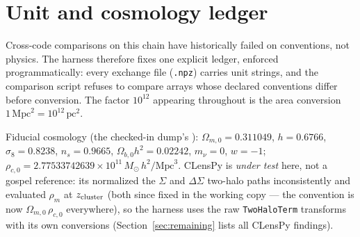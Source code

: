 \section{Unit and cosmology ledger}
\label{sec:ledger}

Cross-code comparisons on this chain have historically failed on
conventions, not physics. The harness therefore fixes one explicit
ledger, enforced programmatically: every exchange file
(\texttt{.npz}) carries unit strings, and the comparison script refuses
to compare arrays whose declared conventions differ before conversion.
The factor $10^{12}$ appearing throughout is the area conversion
$1\,\mathrm{Mpc}^2 = 10^{12}\,\mathrm{pc}^2$.

\begin{table}[H]
\centering
{}
\caption{Unit ledger. The clmm comoving bridge is
$\DStwo^{\rm com}(R^{\rm com}) =
\DStwo^{\rm phys}(R^{\rm com}/(1{+}z))/(1{+}z)^2$ (the single-power
variant used in CLensPy's own test disagrees with the three-way
comparison and is rejected).}
\end{table}

Fiducial cosmology (the checked-in dump's
): $\Omega_{m,0} = 0.311049$, $h = 0.6766$,
$\sigma_8 = 0.8238$, $n_s = 0.9665$, $\Omega_{b,0} h^2 = 0.02242$,
$m_\nu = 0$, $w = -1$;
$\rho_{c,0} = 2.77533742639\times10^{11}\,M_\odot\,h^2/\mathrm{Mpc}^3$.
CLensPy is \emph{under test} here, not a gospel reference: its
 normalized the $\Sigma$ and
$\Delta\Sigma$ two-halo paths inconsistently and evaluated $\rho_m$ at
$z_{\rm cluster}$ (both since fixed in the working copy --- the
convention is now $\Omega_{m,0}\,\rho_{c,0}$ everywhere), so the
harness uses the raw \texttt{TwoHaloTerm} transforms with its own
conversions (Section~\ref{sec:remaining} lists all CLensPy findings).
